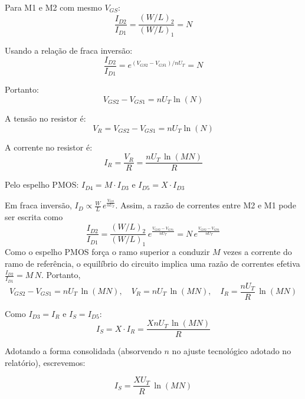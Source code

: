 ﻿\documentclass[12pt,a4paper]{article}
\begin{document}
Para M1 e M2 com mesmo $V_{GS}$:
\begin{equation*}
\frac{I_{D2}}{I_{D1}} = \frac{(W/L)_2}{(W/L)_1} = N
\end{equation*}

Usando a relação de fraca inversão:
\begin{equation*}
\frac{I_{D2}}{I_{D1}} = e^{(V_{GS2} - V_{GS1})/nU_T} = N
\end{equation*}

Portanto:
\begin{equation*}
V_{GS2} - V_{GS1} = nU_T \ln(N)
\end{equation*}

A tensão no resistor é:
\begin{equation*}
V_R = V_{GS2} - V_{GS1} = nU_T \ln(N)
\end{equation*}

A corrente no resistor é:
\begin{equation*}
I_R = \frac{V_R}{R} = \frac{nU_T \,\ln(MN)}{R}
\end{equation*}

Pelo espelho PMOS: $I_{D4} = M \cdot I_{D3}$ e $I_{D5} = X \cdot I_{D3}$

Em fraca inversão, $I_D \propto \tfrac{W}{L}\,e^{\tfrac{V_{GS}}{nU_T}}$. Assim, a razão de correntes entre M2 e M1 pode ser escrita como
\begin{equation}
\frac{I_{D2}}{I_{D1}} = \frac{(W/L)_2}{(W/L)_1}\,e^{\tfrac{V_{GS2}-V_{GS1}}{nU_T}} = N\,e^{\tfrac{V_{GS2}-V_{GS1}}{nU_T}}
\end{equation}
Como o espelho PMOS força o ramo superior a conduzir $M$ vezes a corrente do ramo de referência, o equilíbrio do circuito implica uma razão de correntes efetiva $\tfrac{I_{D2}}{I_{D1}}=M\,N$. Portanto,
\begin{equation}
V_{GS2}-V_{GS1} = nU_T\,\ln(MN), \quad V_R = nU_T\,\ln(MN), \quad I_R = \frac{nU_T}{R}\,\ln(MN)
\end{equation}

Como $I_{D3} = I_R$ e $I_S = I_{D5}$:
\begin{equation}
I_S = X \cdot I_R = \frac{XnU_T \,\ln(MN)}{R}
\end{equation}

Adotando a forma consolidada (absorvendo $n$ no ajuste tecnológico adotado no relatório), escrevemos:

\begin{equation}
\boxed{I_S = \frac{XU_T}{R} \,\ln(MN)}
\end{equation}
\end{document}
